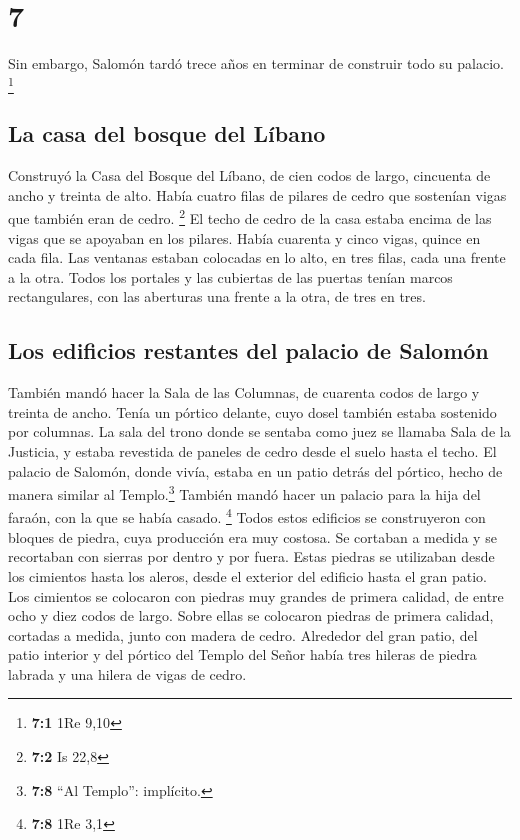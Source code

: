 \hypertarget{section-6}{%
\section{7}\label{section-6}}

 Sin embargo, Salomón tardó trece años en terminar de
construir todo su palacio. \footnote{\textbf{7:1} 1Re 9,10}

\hypertarget{la-casa-del-bosque-del-luxedbano}{%
\subsection{La casa del bosque del
Líbano}\label{la-casa-del-bosque-del-luxedbano}}

 Construyó la Casa del Bosque del Líbano, de cien codos de
largo, cincuenta de ancho y treinta de alto. Había cuatro filas de
pilares de cedro que sostenían vigas que también eran de cedro.
\footnote{\textbf{7:2} Is 22,8}  El techo de cedro de la
casa estaba encima de las vigas que se apoyaban en los pilares. Había
cuarenta y cinco vigas, quince en cada fila.  Las ventanas
estaban colocadas en lo alto, en tres filas, cada una frente a la otra.
 Todos los portales y las cubiertas de las puertas tenían
marcos rectangulares, con las aberturas una frente a la otra, de tres en
tres.

\hypertarget{los-edificios-restantes-del-palacio-de-salomuxf3n}{%
\subsection{Los edificios restantes del palacio de
Salomón}\label{los-edificios-restantes-del-palacio-de-salomuxf3n}}

 También mandó hacer la Sala de las Columnas, de cuarenta
codos de largo y treinta de ancho. Tenía un pórtico delante, cuyo dosel
también estaba sostenido por columnas.  La sala del trono
donde se sentaba como juez se llamaba Sala de la Justicia, y estaba
revestida de paneles de cedro desde el suelo hasta el techo.
 El palacio de Salomón, donde vivía, estaba en un patio
detrás del pórtico, hecho de manera similar al Templo.\footnote{\textbf{7:8}
  ``Al Templo'': implícito.} También mandó hacer un palacio para la hija
del faraón, con la que se había casado. \footnote{\textbf{7:8} 1Re 3,1}
 Todos estos edificios se construyeron con bloques de
piedra, cuya producción era muy costosa. Se cortaban a medida y se
recortaban con sierras por dentro y por fuera. Estas piedras se
utilizaban desde los cimientos hasta los aleros, desde el exterior del
edificio hasta el gran patio.  Los cimientos se colocaron
con piedras muy grandes de primera calidad, de entre ocho y diez codos
de largo.  Sobre ellas se colocaron piedras de primera
calidad, cortadas a medida, junto con madera de cedro. 
Alrededor del gran patio, del patio interior y del pórtico del Templo
del Señor había tres hileras de piedra labrada y una hilera de vigas de
cedro.


